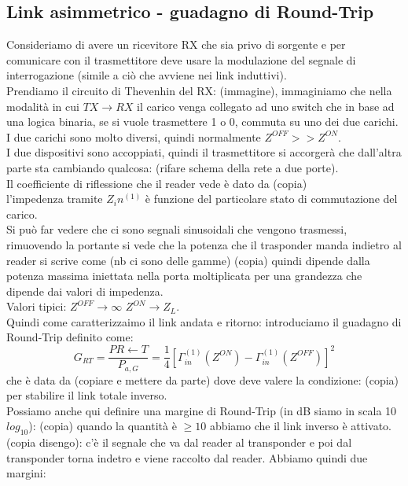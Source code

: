 \documentclass[oneside, 12pt]{extbook}
\begin{document}
\subsection{Link asimmetrico - guadagno di Round-Trip}
Consideriamo di avere un ricevitore RX che sia privo di sorgente e per comunicare con il trasmettitore deve usare la modulazione del segnale di interrogazione (simile a ciò che avviene nei link induttivi).\\Prendiamo il circuito di Thevenhin del RX: (immagine), immaginiamo che nella modalità in cui $TX \rightarrow RX$ il carico venga collegato ad uno switch che in base ad una logica binaria, se si vuole trasmettere 1 o 0, commuta su uno dei due carichi.\\I due carichi sono molto diversi, quindi normalmente $Z^{OFF} >> Z^{ON}$.\\I due dispositivi sono accoppiati, quindi il trasmettitore si accorgerà che dall'altra parte sta cambiando qualcosa: (rifare schema della rete a due porte).\\Il coefficiente di riflessione che il reader vede è dato da (copia)\\
l'impedenza tramite $Z_in^{(1)}$ è funzione del particolare stato di commutazione del carico.\\Si può far vedere che ci sono segnali sinusoidali che vengono trasmessi, rimuovendo la portante si vede che la potenza che il trasponder manda indietro al reader si scrive come (nb ci sono delle gamme) (copia) quindi dipende dalla potenza massima iniettata nella porta moltiplicata per una grandezza che dipende dai valori di impedenza.\\Valori tipici:
$Z^{OFF} \rightarrow \infty$
$Z^{ON} \rightarrow Z_L$.\\Quindi come caratterizzaimo il link andata e ritorno: introduciamo il guadagno di Round-Trip definito come:
\begin{equation}
	G_{RT} = \frac{P{R \leftarrow T}}{P_{a, G}} = \frac{1}{4} [\Gamma_{in}^{(1)} (Z^{ON}) - \Gamma_{in}^{(1)}(Z^{OFF})]^2
\end{equation}
che è data da (copiare e mettere da parte) dove deve valere la condizione: (copia) per stabilire il link totale inverso.\\Possiamo anche qui definire una margine di Round-Trip (in dB siamo in scala 10$log_{10}$): (copia) quando la quantità è $\geq 10$ abbiamo che il link inverso è attivato.(copia disengo): c'è il segnale che va dal reader al transponder e poi dal transponder torna indetro e viene raccolto dal reader. Abbiamo quindi due margini:
\end{document}
